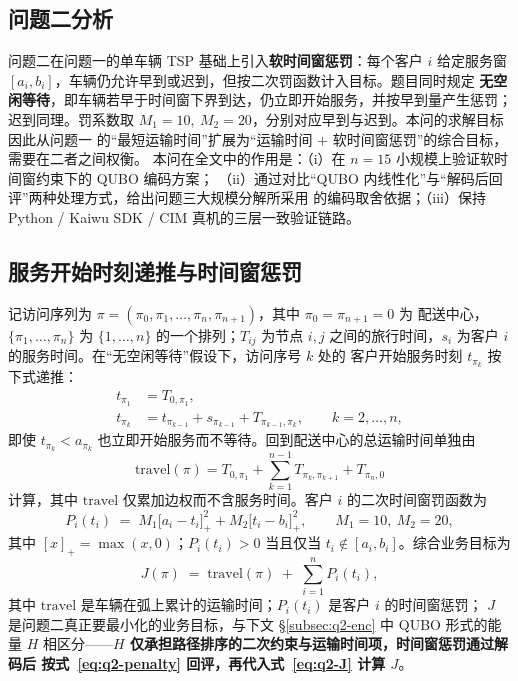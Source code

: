 \documentclass[UTF8,12pt,a4paper]{ctexart}
\begin{document}
\subsection{问题二分析}

问题二在问题一的单车辆 TSP 基础上引入\textbf{软时间窗惩罚}：每个客户 $i$ 给定服务窗
$[a_i,b_i]$，车辆仍允许早到或迟到，但按二次罚函数计入目标。题目同时规定
\textbf{无空闲等待}，即车辆若早于时间窗下界到达，仍立即开始服务，并按早到量产生惩罚；
迟到同理。罚系数取 $M_1=10,\ M_2=20$，分别对应早到与迟到。本问的求解目标因此从问题一
的``最短运输时间''扩展为``运输时间 $+$ 软时间窗惩罚''的综合目标，需要在二者之间权衡。
本问在全文中的作用是：（i）在 $n=15$ 小规模上验证软时间窗约束下的 QUBO 编码方案；
（ii）通过对比``QUBO 内线性化''与``解码后回评''两种处理方式，给出问题三大规模分解所采用
的编码取舍依据；（iii）保持 Python / Kaiwu SDK / CIM 真机的三层一致验证链路。

\subsection{服务开始时刻递推与时间窗惩罚}
\label{subsec:q2-time}

记访问序列为 $\pi=(\pi_0,\pi_1,\dots,\pi_n,\pi_{n+1})$，其中 $\pi_0=\pi_{n+1}=0$ 为
配送中心，$\{\pi_1,\dots,\pi_n\}$ 为 $\{1,\dots,n\}$ 的一个排列；$T_{ij}$ 为节点 $i,j$
之间的旅行时间，$s_i$ 为客户 $i$ 的服务时间。在``无空闲等待''假设下，访问序号 $k$ 处的
客户开始服务时刻 $t_{\pi_k}$ 按下式递推：
\begin{align}
t_{\pi_1} &= T_{0,\pi_1},
   \label{eq:q2-t-first}\\[2pt]
t_{\pi_k} &= t_{\pi_{k-1}} + s_{\pi_{k-1}} + T_{\pi_{k-1},\pi_k},\qquad k=2,\dots,n,
   \label{eq:q2-t-rec}
\end{align}
即使 $t_{\pi_k} < a_{\pi_k}$ 也立即开始服务而不等待。回到配送中心的总运输时间单独由
\begin{equation}
\label{eq:q2-travel}
\mathrm{travel}(\pi) = T_{0,\pi_1} + \sum_{k=1}^{n-1} T_{\pi_k,\pi_{k+1}} + T_{\pi_n,0}
\end{equation}
计算，其中 $\mathrm{travel}$ 仅累加边权而不含服务时间。客户 $i$ 的二次时间窗罚函数为
\begin{equation}
\label{eq:q2-penalty}
P_i(t_i) \;=\; M_1\bigl[a_i - t_i\bigr]_{+}^{2} + M_2\bigl[t_i - b_i\bigr]_{+}^{2},\qquad
M_1 = 10,\ M_2 = 20,
\end{equation}
其中 $[x]_{+}=\max(x,0)$；$P_i(t_i)>0$ 当且仅当 $t_i \notin [a_i,b_i]$。综合业务目标为
\begin{equation}
\label{eq:q2-J}
J(\pi) \;=\; \mathrm{travel}(\pi) \;+\; \sum_{i=1}^{n} P_i(t_i),
\end{equation}
其中 $\mathrm{travel}$ 是车辆在弧上累计的运输时间；$P_i(t_i)$ 是客户 $i$ 的时间窗惩罚；
$J$ 是问题二真正要最小化的业务目标，与下文 §\ref{subsec:q2-enc} 中 QUBO 形式的能量
$H$ 相区分——\textbf{$H$ 仅承担路径排序的二次约束与运输时间项，时间窗惩罚通过解码后
按式~\eqref{eq:q2-penalty} 回评，再代入式~\eqref{eq:q2-J} 计算 $J$}。
\end{document}
